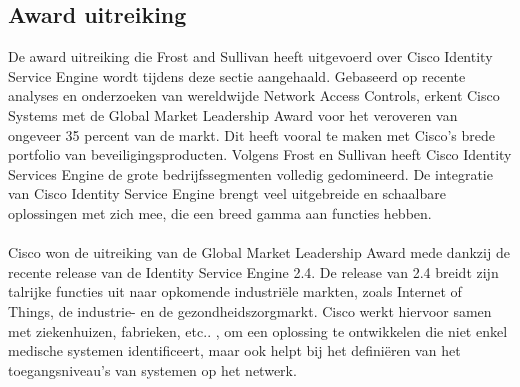 \subsection{Award uitreiking}
De award uitreiking die Frost and Sullivan heeft uitgevoerd over Cisco Identity Service Engine wordt tijdens deze sectie aangehaald. Gebaseerd op recente analyses en onderzoeken van wereldwijde Network Access Controls, erkent \cite{Frost&Sullivan} Cisco Systems met de Global Market Leadership Award voor het veroveren van ongeveer 35 percent van de markt. Dit heeft vooral te maken met Cisco's brede portfolio van beveiligingsproducten. Volgens Frost en Sullivan heeft Cisco Identity Services Engine de grote bedrijfssegmenten volledig gedomineerd. De integratie van Cisco Identity Service Engine brengt veel uitgebreide en schaalbare oplossingen met zich mee, die een breed gamma aan functies hebben. \\ \\ Cisco won de uitreiking van de Global Market Leadership Award mede dankzij de recente release van de Identity Service Engine 2.4. De release van 2.4 breidt zijn talrijke functies uit naar opkomende industriële markten, zoals Internet of Things, de industrie- en de gezondheidszorgmarkt. Cisco werkt hiervoor samen met ziekenhuizen, fabrieken, etc.. , om een oplossing te ontwikkelen die niet enkel medische systemen identificeert, maar ook helpt bij het definiëren van het toegangsniveau's van systemen op het netwerk.




